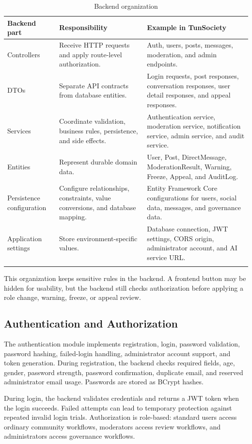 \begin{longtable}{|m{3.5cm}|m{5.2cm}|m{5.4cm}|}
\hline
\textbf{Backend part} & \textbf{Responsibility} & \textbf{Example in TunSociety} \\
\hline
Controllers & Receive HTTP requests and apply route-level authorization. & Auth, users, posts, messages, moderation, and admin endpoints. \\
\hline
DTOs & Separate API contracts from database entities. & Login requests, post responses, conversation responses, user detail responses, and appeal responses. \\
\hline
Services & Coordinate validation, business rules, persistence, and side effects. & Authentication service, moderation service, notification service, admin service, and audit service. \\
\hline
Entities & Represent durable domain data. & User, Post, DirectMessage, ModerationResult, Warning, Freeze, Appeal, and AuditLog. \\
\hline
Persistence configuration & Configure relationships, constraints, value conversions, and database mapping. & Entity Framework Core configurations for users, social data, messages, and governance data. \\
\hline
Application settings & Store environment-specific values. & Database connection, JWT settings, CORS origin, administrator account, and AI service URL. \\
\hline
\caption{Backend organization}
\end{longtable}

This organization keeps sensitive rules in the backend. A frontend button may be hidden for usability, but the backend still checks authorization before applying a role change, warning, freeze, or appeal review.

\subsection{Authentication and Authorization}

The authentication module implements registration, login, password validation, password hashing, failed-login handling, administrator account support, and token generation. During registration, the backend checks required fields, age, gender, password strength, password confirmation, duplicate email, and reserved administrator email usage. Passwords are stored as BCrypt hashes.

During login, the backend validates credentials and returns a JWT token when the login succeeds. Failed attempts can lead to temporary protection against repeated invalid login trials. Authorization is role-based: standard users access ordinary community workflows, moderators access review workflows, and administrators access governance workflows.

